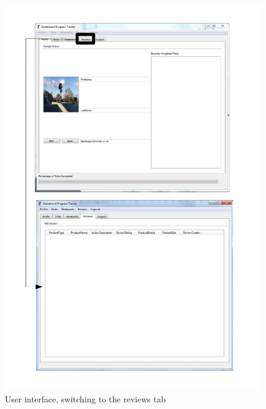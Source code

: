 \begin{figure}[H]
    \includegraphics[width=\textwidth]{./Maintenance/Figures/ReviewTab.pdf}
    \caption{User interface, switching to the reviews tab} \label{fig:Review Tab UI}
\end{figure}


